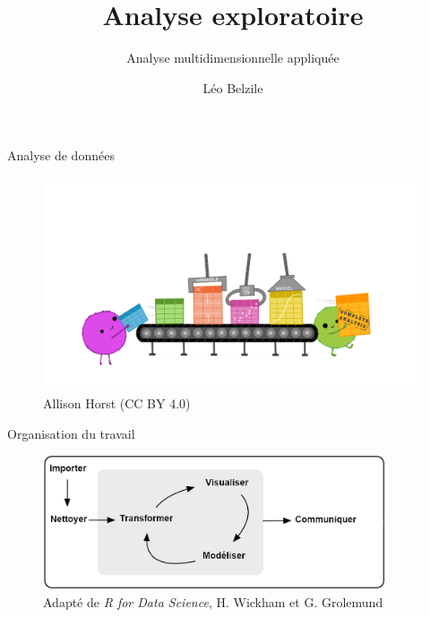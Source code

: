 \documentclass[
  ignorenonframetext,
]{beamer}
\title{Analyse exploratoire}
\subtitle{Analyse multidimensionnelle appliquée}
\author{Léo Belzile}
\date{}
\institute{HEC Montréal}
\begin{document}
\frame{\titlepage}
\ifdefined\Shaded\renewenvironment{Shaded}{\begin{tcolorbox}[breakable, borderline west={3pt}{0pt}{shadecolor}, boxrule=0pt, interior hidden, frame hidden, sharp corners, enhanced]}{\end{tcolorbox}}\fi

\begin{frame}{Analyse de données}
\protect\hypertarget{analyse-de-donnuxe9es}{}
\begin{figure}

{\centering \includegraphics[width=1\textwidth,height=\textheight]{figures/tidydata_5.jpg}

}

\caption{Allison Horst (CC BY 4.0)}

\end{figure}
\end{frame}

\begin{frame}{Organisation du travail}
\protect\hypertarget{organisation-du-travail}{}
\begin{figure}

{\centering \includegraphics[width=0.9\textwidth,height=\textheight]{figures/r4ds_data-science_fr.png}

}

\caption{Adapté de \emph{R for Data Science}, H. Wickham et G.
Grolemund}

\end{figure}
\end{frame}
\end{document}
